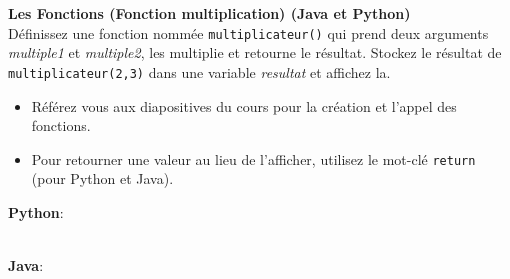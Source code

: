    \begin{Exercice}[5 minutes] \textbf{Les Fonctions (Fonction multiplication) (Java \textbf{et} Python)}\\
    Définissez une fonction nommée \lstinline{multiplicateur()} qui prend deux arguments \textit{multiple1} et \textit{multiple2}, les multiplie et retourne le résultat. Stockez le résultat de \lstinline{multiplicateur(2,3)} dans une variable \textit{resultat} et affichez la.   \\

    \begin{conseil}
        \begin{itemize}
            \item Référez vous aux diapositives du cours pour la création et l'appel des fonctions.
            \item Pour retourner une valeur au lieu de l'afficher, utilisez le mot-clé \lstinline{return} (pour Python et Java).
        \end{itemize}        
    \end{conseil}
    \begin{solution}
        \textbf{Python}:
        
        
        \textbf{\\Java}:
        
    \end{solution}   
\end{Exercice} 
  
